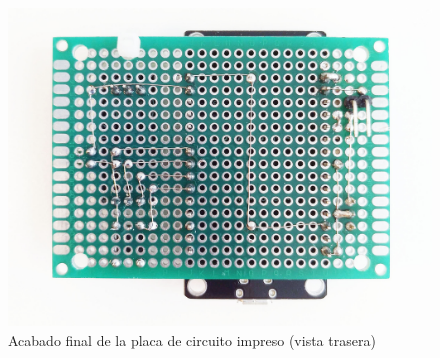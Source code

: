 \vfill

\clearpage

\begin{figure}
  \centering
  \includegraphics[width=1\columnwidth]{../photos/exterior-pcb-back}
  \caption{Acabado final de la placa de circuito impreso (vista trasera)}
  \label{fig:exterior-pcb-back}
\end{figure}

\clearpage

